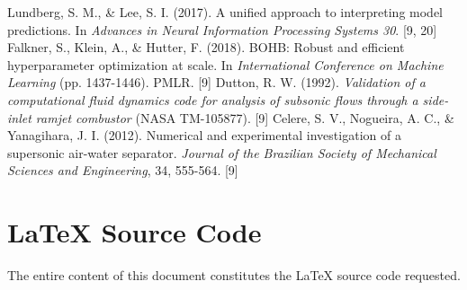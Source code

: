 \documentclass[12pt, a4paper]{report}
\begin{document}
\begin{thebibliography}{99}
 Lundberg, S. M., \& Lee, S. I. (2017). A unified approach to interpreting model predictions. In \textit{Advances in Neural Information Processing Systems 30}. [9, 20]
 Falkner, S., Klein, A., \& Hutter, F. (2018). BOHB: Robust and efficient hyperparameter optimization at scale. In \textit{International Conference on Machine Learning} (pp. 1437-1446). PMLR. [9]
 Dutton, R. W. (1992). \textit{Validation of a computational fluid dynamics code for analysis of subsonic flows through a side-inlet ramjet combustor} (NASA TM-105877). [9]
 Celere, S. V., Nogueira, A. C., \& Yanagihara, J. I. (2012). Numerical and experimental investigation of a supersonic air-water separator. \textit{Journal of the Brazilian Society of Mechanical Sciences and Engineering}, 34, 555-564. [9]
\end{thebibliography}

\appendix
\chapter{LaTeX Source Code}
The entire content of this document constitutes the LaTeX source code requested.
\end{document}
